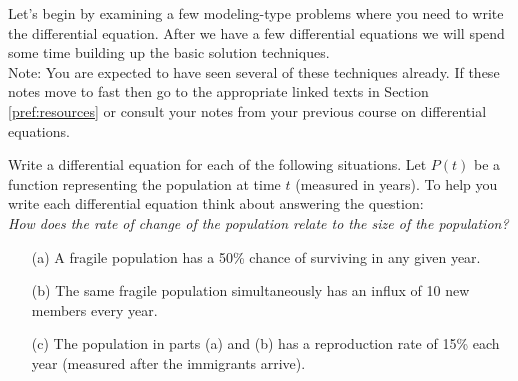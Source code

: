 Let's begin by examining a few modeling-type problems where you need to write the
differential equation.  After we have a few differential equations we will spend some time
building up the basic solution techniques. \\
Note: You are expected to have seen several of these techniques already.  If these notes
move to fast then go to the appropriate linked texts in Section \ref{pref:resources} or
consult your notes from your previous course on differential equations.

\begin{problem}%
    Write a differential equation for each of the following situations.  Let $P(t)$ be a
    function representing the population at time $t$ (measured in years).  To help you write each differential equation think
    about answering the question: \\
    {\it How does the rate of change of the population relate to the size of the population?}
    \begin{enumerate}
        \item[(a)] A fragile population has a 50\% chance of surviving in any given year.  
        \item[(b)] The same fragile population simultaneously has an influx of 10 new
            members every year.
        \item[(c)] The population in parts (a) and (b) has a reproduction rate of 15\%
            each year (measured after the immigrants arrive).
    \end{enumerate}
\end{problem}

